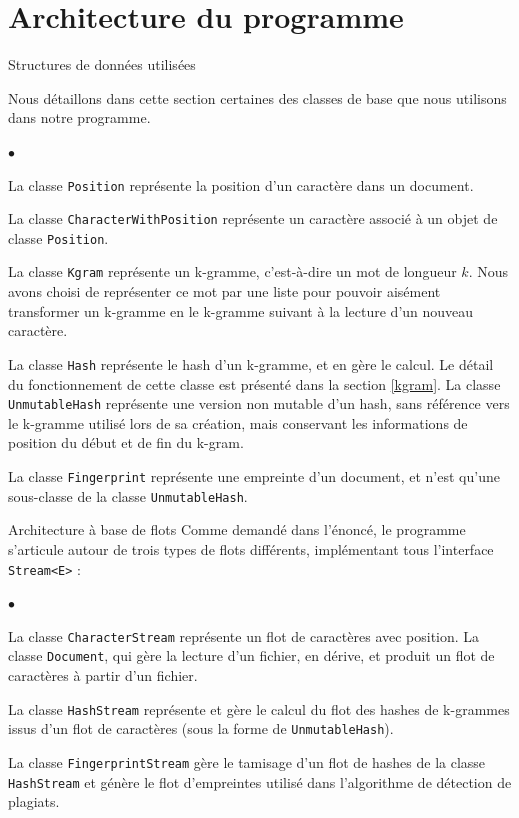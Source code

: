 \documentclass[a4paper,twoside,12pt]{article}
\newcounter{partie}
\newcounter{sous-partie}
\newenvironment{partie}[1]
{
\section{#1}
}
{

}
\newenvironment{sous-partie}[1]
{
\subsection{#1}
}
{

}
\newenvironment{liste}
{
\vspace{0.2cm}
\begin{list}{$\bullet$\hspace{0.3cm}}{\leftmargin=1.4cm}
}
{
\end{list}
\vspace{0.2cm}
}
\begin{document}
\begin{partie}{Architecture du programme}
\begin{sous-partie}{Structures de données utilisées}
\begin{paragraph}{}
Nous détaillons dans cette section certaines des classes de base que nous utilisons dans notre programme.
\begin{liste}
\item La classe \texttt{Position} représente la position d'un caractère dans un document.
\item La classe \texttt{CharacterWithPosition} représente un caractère associé à un objet de classe \texttt{Position}.
\item La classe \texttt{Kgram} représente un k-gramme, c'est-à-dire un mot de longueur $k$. Nous avons choisi de représenter ce mot par une liste pour pouvoir aisément transformer un k-gramme en le k-gramme suivant à la lecture d'un nouveau caractère.
\item La classe \texttt{Hash} représente le hash d'un k-gramme, et en gère le calcul. Le détail du fonctionnement de cette classe est présenté dans la section \ref{kgram}. La classe \texttt{UnmutableHash} représente une version non mutable d'un hash, sans référence vers le k-gramme utilisé lors de sa création, mais conservant les informations de position du début et de fin du k-gram.
\item La classe \texttt{Fingerprint} représente une empreinte d'un document, et n'est qu'une sous-classe de la classe \texttt{UnmutableHash}.
\end{liste}

\end{paragraph}
\end{sous-partie}
\vspace{-0.3cm}

\begin{sous-partie}{Architecture à base de flots}
Comme demandé dans l'énoncé, le programme s'articule autour de trois types de flots différents, implémentant tous l'interface \texttt{Stream<E>} :
\begin{liste}
\item La classe \texttt{CharacterStream} représente un flot de caractères avec position. La classe \texttt{Document}, qui gère la lecture d'un fichier, en dérive, et produit un flot de caractères à partir d'un fichier.
\item La classe \texttt{HashStream} représente et gère le calcul du flot des hashes de k-grammes issus d'un flot de caractères (sous la forme de \texttt{UnmutableHash}).
\item La classe \texttt{FingerprintStream} gère le tamisage d'un flot de hashes de la classe \texttt{HashStream} et génère le flot d'empreintes utilisé dans l'algorithme de détection de plagiats.
\end{liste}
\end{sous-partie}


\end{partie}
\end{document}
